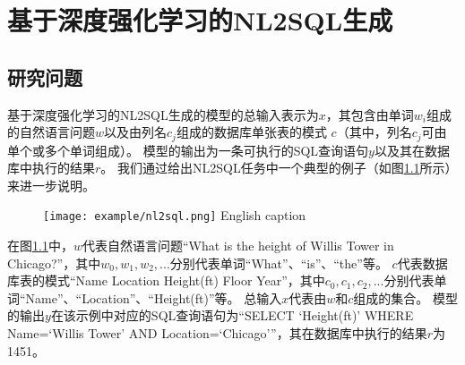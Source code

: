 
\chapter{基于深度强化学习的NL2SQL生成}
\label{chap:enl2sql}

\section{研究问题}


基于深度强化学习的NL2SQL生成的模型的总输入表示为$x$，其包含由单词$w_{i}$组成的自然语言问题$w$以及由列名$c_{j}$组成的数据库单张表的模式 $c$（其中，列名$c_{j}$可由单个或多个单词组成）。
模型的输出为一条可执行的SQL查询语句$y$以及其在数据库中执行的结果$r$。
我们通过给出NL2SQL任务中一个典型的例子（如图\ref{fig:nl2sqlexample}所示）来进一步说明。

\begin{figure}[!htp]
    \centering
    \texttt{[image: example/nl2sql.png]}
      {English caption}
    \label{fig:nl2sqlexample}
  \end{figure}

在图\ref{fig:nl2sqlexample}中，$w$代表自然语言问题“What is  the height of Willis Tower in Chicago?”，其中$w_0,w_1,w_2,...$分别代表单词“What”、“is”、“the”等。
$c$代表数据库表的模式“Name Location Height(ft) Floor Year”，其中$c_0,c_1,c_2,...$分别代表单词“Name”、“Location”、“Height(ft)”等。
总输入$x$代表由$w$和$c$组成的集合。
模型的输出$y$在该示例中对应的SQL查询语句为“SELECT ‘Height(ft)’ WHERE Name=‘Willis Tower’ AND Location=‘Chicago’”，其在数据库中执行的结果$r$为1451。

